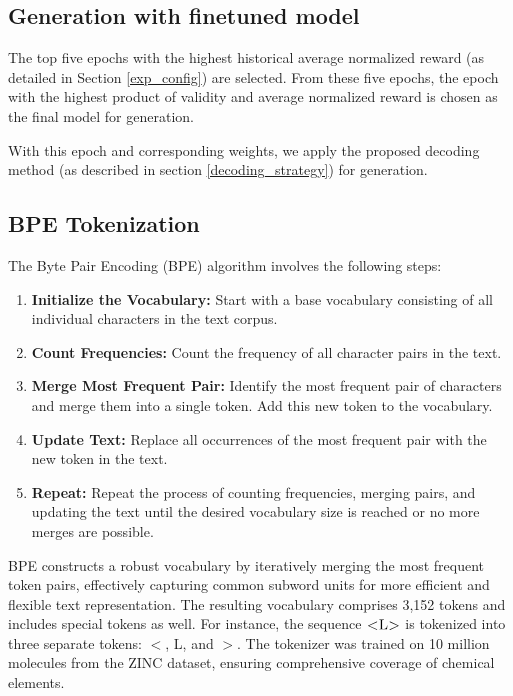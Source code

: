 


{
\subsection{Generation with finetuned model}\label{app:generation}
The top five epochs with the highest historical average normalized reward (as detailed in Section \ref{exp_config}) are selected. From these five epochs, the epoch with the highest product of validity and average normalized reward is chosen as the final model for generation.

With this epoch and corresponding weights, we apply the proposed decoding method (as described in section \ref{decoding_strategy}) for generation. 
}





\subsection{{BPE Tokenization}}\label{app:BPE}
The Byte Pair Encoding (BPE) algorithm involves the following steps:
\begin{enumerate}[noitemsep, topsep=0pt, partopsep=0pt]
    \item \textbf{Initialize the Vocabulary:} Start with a base vocabulary consisting of all individual characters in the text corpus.
    \item \textbf{Count Frequencies:} Count the frequency of all character pairs in the text.
    \item \textbf{Merge Most Frequent Pair:} Identify the most frequent pair of characters and merge them into a single token. Add this new token to the vocabulary.
    \item \textbf{Update Text:} Replace all occurrences of the most frequent pair with the new token in the text.
    \item \textbf{Repeat:} Repeat the process of counting frequencies, merging pairs, and updating the text until the desired vocabulary size is reached or no more merges are possible.
\end{enumerate}
BPE constructs a robust vocabulary by iteratively merging the most frequent token pairs, effectively capturing common subword units for more efficient and flexible text representation. The resulting vocabulary comprises 3,152 tokens and includes special tokens as well. For instance, the sequence $\textsc{<L>}$ is tokenized into three separate tokens: $<$, L, and $>$. The tokenizer was trained on 10 million molecules from the ZINC dataset, ensuring comprehensive coverage of chemical elements.


